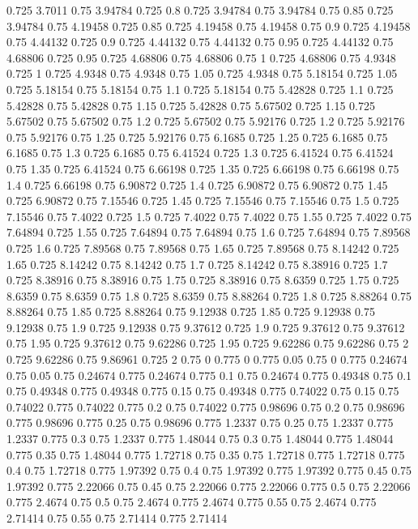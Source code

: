 0.725 3.7011
0.75 3.94784
0.725 0.8
0.725 3.94784
0.75 3.94784
0.75 0.85
0.725 3.94784
0.75 4.19458
0.725 0.85
0.725 4.19458
0.75 4.19458
0.75 0.9
0.725 4.19458
0.75 4.44132
0.725 0.9
0.725 4.44132
0.75 4.44132
0.75 0.95
0.725 4.44132
0.75 4.68806
0.725 0.95
0.725 4.68806
0.75 4.68806
0.75 1
0.725 4.68806
0.75 4.9348
0.725 1
0.725 4.9348
0.75 4.9348
0.75 1.05
0.725 4.9348
0.75 5.18154
0.725 1.05
0.725 5.18154
0.75 5.18154
0.75 1.1
0.725 5.18154
0.75 5.42828
0.725 1.1
0.725 5.42828
0.75 5.42828
0.75 1.15
0.725 5.42828
0.75 5.67502
0.725 1.15
0.725 5.67502
0.75 5.67502
0.75 1.2
0.725 5.67502
0.75 5.92176
0.725 1.2
0.725 5.92176
0.75 5.92176
0.75 1.25
0.725 5.92176
0.75 6.1685
0.725 1.25
0.725 6.1685
0.75 6.1685
0.75 1.3
0.725 6.1685
0.75 6.41524
0.725 1.3
0.725 6.41524
0.75 6.41524
0.75 1.35
0.725 6.41524
0.75 6.66198
0.725 1.35
0.725 6.66198
0.75 6.66198
0.75 1.4
0.725 6.66198
0.75 6.90872
0.725 1.4
0.725 6.90872
0.75 6.90872
0.75 1.45
0.725 6.90872
0.75 7.15546
0.725 1.45
0.725 7.15546
0.75 7.15546
0.75 1.5
0.725 7.15546
0.75 7.4022
0.725 1.5
0.725 7.4022
0.75 7.4022
0.75 1.55
0.725 7.4022
0.75 7.64894
0.725 1.55
0.725 7.64894
0.75 7.64894
0.75 1.6
0.725 7.64894
0.75 7.89568
0.725 1.6
0.725 7.89568
0.75 7.89568
0.75 1.65
0.725 7.89568
0.75 8.14242
0.725 1.65
0.725 8.14242
0.75 8.14242
0.75 1.7
0.725 8.14242
0.75 8.38916
0.725 1.7
0.725 8.38916
0.75 8.38916
0.75 1.75
0.725 8.38916
0.75 8.6359
0.725 1.75
0.725 8.6359
0.75 8.6359
0.75 1.8
0.725 8.6359
0.75 8.88264
0.725 1.8
0.725 8.88264
0.75 8.88264
0.75 1.85
0.725 8.88264
0.75 9.12938
0.725 1.85
0.725 9.12938
0.75 9.12938
0.75 1.9
0.725 9.12938
0.75 9.37612
0.725 1.9
0.725 9.37612
0.75 9.37612
0.75 1.95
0.725 9.37612
0.75 9.62286
0.725 1.95
0.725 9.62286
0.75 9.62286
0.75 2
0.725 9.62286
0.75 9.86961
0.725 2
0.75 0
0.775 0
0.775 0.05
0.75 0
0.775 0.24674
0.75 0.05
0.75 0.24674
0.775 0.24674
0.775 0.1
0.75 0.24674
0.775 0.49348
0.75 0.1
0.75 0.49348
0.775 0.49348
0.775 0.15
0.75 0.49348
0.775 0.74022
0.75 0.15
0.75 0.74022
0.775 0.74022
0.775 0.2
0.75 0.74022
0.775 0.98696
0.75 0.2
0.75 0.98696
0.775 0.98696
0.775 0.25
0.75 0.98696
0.775 1.2337
0.75 0.25
0.75 1.2337
0.775 1.2337
0.775 0.3
0.75 1.2337
0.775 1.48044
0.75 0.3
0.75 1.48044
0.775 1.48044
0.775 0.35
0.75 1.48044
0.775 1.72718
0.75 0.35
0.75 1.72718
0.775 1.72718
0.775 0.4
0.75 1.72718
0.775 1.97392
0.75 0.4
0.75 1.97392
0.775 1.97392
0.775 0.45
0.75 1.97392
0.775 2.22066
0.75 0.45
0.75 2.22066
0.775 2.22066
0.775 0.5
0.75 2.22066
0.775 2.4674
0.75 0.5
0.75 2.4674
0.775 2.4674
0.775 0.55
0.75 2.4674
0.775 2.71414
0.75 0.55
0.75 2.71414
0.775 2.71414
